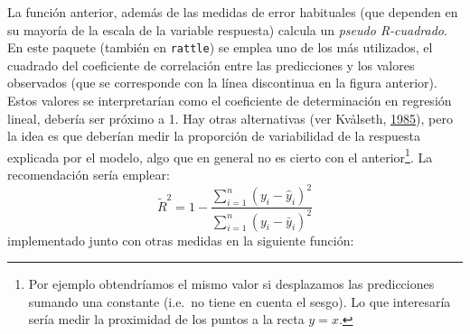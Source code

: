 \documentclass[
  spanish,
]{book}
\theoremstyle{break}
\theoremstyle{definition}
\theoremstyle{definition}
\theoremstyle{definition}
\theoremstyle{remark}
\begin{document}
La función anterior, además de las medidas de error habituales (que dependen en su mayoría de la escala de la variable respuesta) calcula un \emph{pseudo R-cuadrado}.
En este paquete (también en \texttt{rattle}) se emplea uno de los más utilizados, el cuadrado del coeficiente de correlación entre las predicciones y los valores observados (que se corresponde con la línea discontinua en la figura anterior).
Estos valores se interpretarían como el coeficiente de determinación en regresión lineal, debería ser próximo a 1.
Hay otras alternativas (ver Kvålseth, \protect\hyperlink{ref-kvaalseth1985cautionary}{1985}), pero la idea es que deberían medir la proporción de variabilidad de la respuesta explicada por el modelo, algo que en general no es cierto con el anterior\footnote{Por ejemplo obtendríamos el mismo valor si desplazamos las predicciones sumando una constante (i.e.~no tiene en cuenta el sesgo). Lo que interesaría sería medir la proximidad de los puntos a la recta \(y=x\).}.
La recomendación sería emplear:
\[\tilde R^2 = 1 - \frac{\sum_{i=1}^n(y_i - \hat y_i)^2}{\sum_{i=1}^n(y_i - \bar y_i)^2}\]
implementado junto con otras medidas en la siguiente función:
\end{document}

